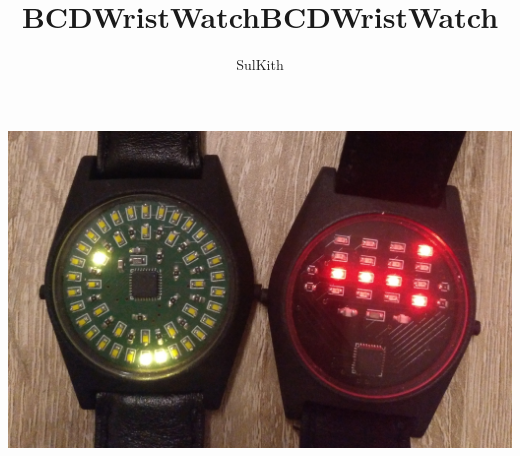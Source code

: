 \documentclass[12pt,a4paper,final]{article}
\title{BCDWristWatch}
\date{\vspace{-10ex}}
\begin{document}
\title{BCDWristWatch}
\author{SulKith}
\maketitle
\vspace{5cm}
\begin{center}
  \includegraphics[width=\textwidth]{../Pictures/AnalogClock.jpg}
\end{center}




\end{document}

